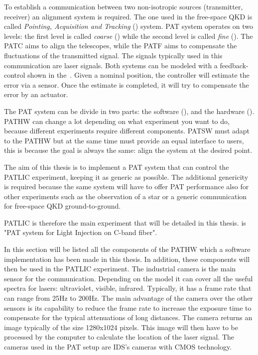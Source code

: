 To establish a communication between two non-isotropic sources (transmitter, receiver) an alignment system is required. The one used in the free-space QKD is called \textit{Pointing, Acquisition and Tracking} () system. PAT system operates on two levels: the first level is called \textit{coarse} () while the second level is called \textit{fine} ().
The PATC aims to align the telescopes, while the PATF aims to compensate the fluctuations of the transmitted signal. The signals typically used in this communication are laser signals. Both systems can be modeled with a feedback-control shown in the~.
Given a nominal position, the controller will estimate the error via a sensor. Once the estimate is completed, it will try to compensate the error by an actuator.

The PAT system can be divide in two parts: the software (), and the hardware ().
PATHW can change a lot depending on what experiment you want to do, because different experiments require different components. PATSW must adapt to the PATHW but at the same time must provide an equal interface to users, this is because the goal is always the same: align the system at the desired point.

The aim of this thesis is to implement a PAT system that can control the PATLIC experiment, keeping it as generic as possible.
The additional genericity is required because the same system will have to offer PAT performance also for other experiments such as the observation of a star or a generic communication for free-space QKD ground-to-ground.

PATLIC is therefore the main experiment that will be detailed in this thesis.  is "PAT system for Light Injection on C-band fiber".

In this section will be listed all the components of the PATHW which a software implementation has been made in this thesis. In addition, these components will then be used in the PATLIC experiment.
The industrial camera is the main sensor for the communication. Depending on the model it can cover all the useful spectra for lasers: ultraviolet, visible, infrared.
Typically, it has a frame rate that can range from 25Hz to 200Hz. The main advantage of the camera over the other sensors is its capability to reduce the frame rate to increase the exposure time to compensate for the typical attenuations of long distances.
The camera returns an image typically of the size 1280x1024 pixels. This image will then have to be processed by the computer to calculate the location of the laser signal.
The cameras used in the PAT setup are IDS's cameras with CMOS technology.


